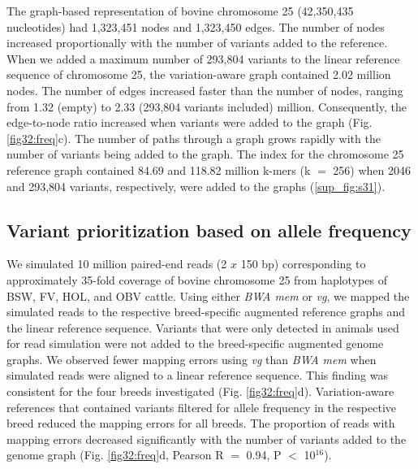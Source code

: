 \documentclass[../main.tex]{subfiles}
\begin{document}
The graph-based representation of bovine chromosome 25 (42,350,435 nucleotides) had 1,323,451 nodes and 1,323,450 edges. The number of nodes increased proportionally with the number of variants added to the reference. When we added a maximum number of 293,804 variants to the linear reference sequence of chromosome 25, the variation-aware graph contained 2.02 million nodes. The number of edges increased faster than the number of nodes, ranging from 1.32 (empty) to 2.33 (293,804 variants included) million. Consequently, the edge-to-node ratio increased when variants were added to the graph (Fig. \ref{fig32:freq}c). The number of paths through a graph grows rapidly with the number of variants being added to the graph. The index for the chromosome 25 reference graph contained 84.69 and 118.82 million k-mers (k $=$ 256) when 2046 and 293,804 variants, respectively, were added to the graphs (\ref{sup_fig:s31}).


\subsection*{Variant prioritization based on allele frequency}
We simulated 10 million paired-end reads (2 $x$ 150 bp) corresponding to approximately 35-fold coverage of bovine chromosome 25 from haplotypes of BSW, FV, HOL, and OBV cattle. Using either \emph{BWA mem} or \emph{vg}, we mapped the simulated reads to the respective breed-specific augmented reference graphs and the linear reference sequence. Variants that were only detected in animals used for read simulation were not added to the breed-specific augmented genome graphs. We observed fewer mapping errors using \emph{vg} than \emph{BWA mem} when simulated reads were aligned to a linear reference sequence. This finding was consistent for the four breeds investigated (Fig. \ref{fig32:freq}d). Variation-aware references that contained variants filtered for allele frequency in the respective breed reduced the mapping errors for all breeds. The proportion of reads with mapping errors decreased significantly with the number of variants added to the genome graph (Fig. \ref{fig32:freq}d, Pearson R $=$ 0.94, P $<$ 10$^{16}$).
\end{document}
